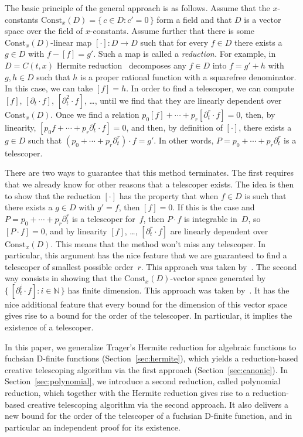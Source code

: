 \documentclass[final,1p,times,authoryear]{elsarticle}
\let\set\mathbb
\begin{document}
The basic principle of the general approach is as follows. Assume that the
$x$-constants $\mathrm{Const}_x(D)=\{\,c\in D:c'=0\,\}$ form a field and that $D$
is a vector space over the field of $x$-constants. Assume further that there is
some $\mathrm{Const}_x(D)$-linear map $[\cdot]\colon D\to D$ such that for every
$f\in D$ there exists a $g\in D$ with $f-[f]=g'$. Such a map is called a
\emph{reduction.} For example, in $D=C(t,x)$ Hermite reduction~\citep{Hermite1872} decomposes
any $f\in D$ into $f=g'+h$ with $g,h\in D$ such that $h$ is a proper rational function
with a squarefree denominator. In this case, we can take $[f]=h$.
In order to find a telescoper, we can compute $[f]$, $[\partial_t\cdot f]$, $[\partial_t^2\cdot f]$, \dots,
until we find that they are linearly dependent over $\mathrm{Const}_x(D)$.
Once we find a relation
$p_0[f] + \cdots + p_r[\partial_t^r\cdot f] = 0$,
then, by linearity,
$[p_0 f + \cdots + p_r \partial_t^r\cdot f] = 0$,
and then, by definition of $[\cdot]$, there exists a $g\in D$ such that $(p_0+\cdots + p_r\partial_t^r)\cdot f=g'$.
In other words, $P=p_0+\cdots + p_r\partial_t^r$ is a telescoper.

There are two ways to guarantee that this method terminates. The first
requires that we already know for other reasons that a telescoper exists. The
idea is then to show that the reduction $[\cdot]$ has the property that when
$f\in D$ is such that there exists a $g\in D$ with $g'=f$, then $[f]=0$. If
this is the case and $P=p_0+\cdots+p_r\partial_t^r$ is a telescoper for~$f$,
then $P\cdot f$ is integrable in~$D$, so $[P\cdot f]=0$, and by linearity
$[f]$, \dots, $[\partial_t^r\cdot f]$ are linearly dependent over
$\mathrm{Const}_x(D)$. This means that the method won't miss any
telescoper. In particular, this argument has the nice feature that we are
guaranteed to find a telescoper of smallest possible order~$r$. This approach
was taken by~\cite{chen15a}. The second way consists in showing that the
$\mathrm{Const}_x(D)$-vector space generated by $\{\,[\partial_t^i\cdot
  f]:i\in\set N\,\}$ has finite dimension. This approach was taken
by~\cite{BCCL2010,bostan13a}. It has the nice additional feature that every
bound for the dimension of this vector space gives rise to a bound for the
order of the telescoper. In particular, it implies the existence of a
telescoper.

In this paper, we generalize Trager's Hermite reduction for algebraic
functions to fuchsian D-finite functions (Section~\ref{sec:hermite}), which
yields a reduction-based creative telescoping algorithm via the first approach
(Section~\ref{sec:canonic}). In Section~\ref{sec:polynomial}, we introduce a
second reduction, called polynomial reduction, which together with the Hermite
reduction gives rise to a reduction-based creative telescoping algorithm via
the second approach.  It also delivers a new bound for the order of the
telescoper of a fuchsian D-finite function, and in particular an independent
proof for its existence.
\end{document}
